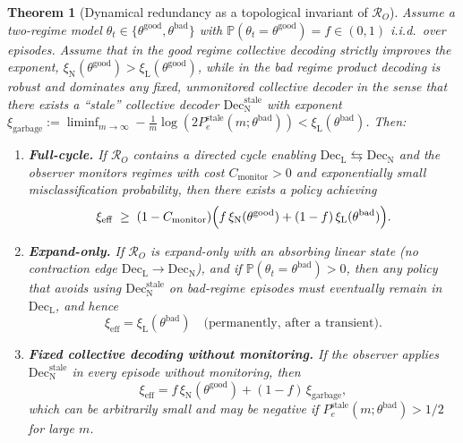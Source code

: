 \documentclass[11pt]{article}
\newcommand{\cR}{\mathcal{R}}
\newcommand{\Prob}{\mathbb{P}}
\newcommand{\1}{\mathbf{1}}
\newcommand{\QCBdist}{\xi}
\theoremstyle{definition}
\theoremstyle{plain}
\newtheorem{theorem}{Theorem}
\begin{document}
\begin{theorem}[Dynamical redundancy as a topological invariant of $\cR_O$]
\label{thm:dynamical-redundancy-topology}
Assume a two-regime model $\theta_t\in\{\theta^{\mathrm{good}},\theta^{\mathrm{bad}}\}$ with $\Prob(\theta_t=\theta^{\mathrm{good}})=f\in(0,1)$ i.i.d.\ over episodes.
Assume that in the good regime collective decoding strictly improves the exponent,
$\QCBdist_{\mathrm{N}}(\theta^{\mathrm{good}})>\QCBdist_{\mathrm{L}}(\theta^{\mathrm{good}})$,
while in the bad regime product decoding is robust and dominates any fixed, unmonitored collective decoder in the sense that there exists a ``stale'' collective decoder $\mathrm{Dec}_{\mathrm{N}}^{\mathrm{stale}}$ with exponent
$\QCBdist_{\mathrm{garbage}}:=\liminf_{m\to\infty}-\frac{1}{m}\log(2P_{e}^{\mathrm{stale}}(m;\theta^{\mathrm{bad}}))<\QCBdist_{\mathrm{L}}(\theta^{\mathrm{bad}})$.
Then:
\begin{enumerate}[leftmargin=2.2em,label=(\roman*)]
\item \textbf{Full-cycle.} If $\cR_O$ contains a directed cycle enabling $\mathrm{Dec}_{\mathrm{L}}\leftrightarrows \mathrm{Dec}_{\mathrm{N}}$ and the observer monitors regimes with cost $C_{\mathrm{monitor}}>0$ and exponentially small misclassification probability, then there exists a policy achieving
\[
\QCBdist_{\mathrm{eff}}
\;\ge\;
(1-C_{\mathrm{monitor}})
\Bigl(
f\,\QCBdist_{\mathrm{N}}(\theta^{\mathrm{good}})
+(1-f)\,\QCBdist_{\mathrm{L}}(\theta^{\mathrm{bad}})
\Bigr).
\]
\item \textbf{Expand-only.} If $\cR_O$ is expand-only with an absorbing linear state (no contraction edge $\mathrm{Dec}_{\mathrm{L}}\to \mathrm{Dec}_{\mathrm{N}}$), and if $\Prob(\theta_t=\theta^{\mathrm{bad}})>0$, then any policy that avoids using $\mathrm{Dec}_{\mathrm{N}}^{\mathrm{stale}}$ on bad-regime episodes must eventually remain in $\mathrm{Dec}_{\mathrm{L}}$, and hence
\[
\QCBdist_{\mathrm{eff}}
=
\QCBdist_{\mathrm{L}}(\theta^{\mathrm{bad}})
\quad\text{(permanently, after a transient)}.
\]
\item \textbf{Fixed collective decoding without monitoring.} If the observer applies $\mathrm{Dec}_{\mathrm{N}}^{\mathrm{stale}}$ in every episode without monitoring, then
\[
\QCBdist_{\mathrm{eff}}
=
f\,\QCBdist_{\mathrm{N}}(\theta^{\mathrm{good}})
+
(1-f)\,\QCBdist_{\mathrm{garbage}},
\]
which can be arbitrarily small and may be negative if $P_{e}^{\mathrm{stale}}(m;\theta^{\mathrm{bad}})>1/2$ for large $m$.
\end{enumerate}
\end{theorem}
\end{document}
